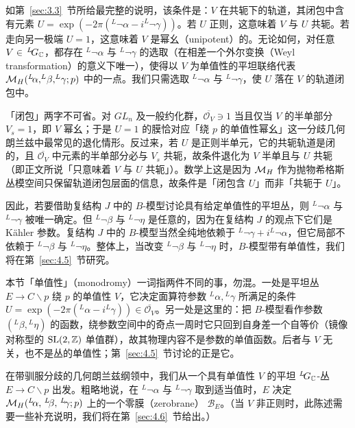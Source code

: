 如第~\ref{sec:3.3}~节所给最完整的说明，该条件是：$V$ 在共轭下的轨道，其闭包中含有元素 $U=\exp(-2\pi(^L\neg\alpha-i^L\neg\gamma))$。若 $U$ 正则，这意味着 $V$ 与 $U$ 共轭。若走向另一极端 $U=1$，这意味着 $V$ 是幂幺（unipotent）的。无论如何，对任意 $V\in\, ^L\negthinspace G_{\mathbb{C}}$，都存在 $^L\neg\alpha$ 与 $^L\neg\gamma$ 的选取（在相差一个外尔变换（Weyl transformation）的意义下唯一），使得以 $V$ 为单值性的平坦联络代表
${{\mathcal{M}}_H}(^L\negthinspace\alpha,^L\negthinspace\beta,^L\negthinspace\gamma;p)$ 中的一点。我们只需选取
$^L\neg\alpha$ 与 $^L\neg\gamma$，使 $U$ 落在 $V$ 的轨道闭包中。

\begin{yizhu}[含糊点拨]
「闭包」两字不可省。对 $GL_n$ 及一般约化群，$\overline{\mathcal O_V}\ni1$ 当且仅当 $V$ 的半单部分 $V_s=1$，即 $V$ 幂幺；于是 $U=1$ 的膜恰对应「绕 $p$ 的单值性幂幺」这一分歧几何朗兰兹中最常见的退化情形。反过来，若 $U$ 是正则半单元，它的共轭轨道是闭的，且 $\overline{\mathcal O_V}$ 中元素的半单部分必与 $V_s$ 共轭，故条件退化为 $V$ 半单且与 $U$ 共轭（即正文所说「只意味着 $V$ 与 $U$ 共轭」）。数学上这是因为 ${{\mathcal{M}}_H}$ 作为抛物希格斯丛模空间只保留轨道闭包层面的信息，故条件是「闭包含 $U$」而非「共轭于 $U$」。
\end{yizhu}

因此，若要借助复结构 $J$ 中的 $B$-模型讨论具有给定单值性的平坦丛，则
$^L\neg\alpha$ 与 $^L\neg\gamma$ 被唯一确定。但
$^L\neg\beta$ 与 $^L\neg\eta$ 是任意的，因为在复结构 $J$ 的观点下它们是 Kähler 参数。复结构 $J$ 中的
$B$-模型当然全纯地依赖于 $^L\neg\gamma+i^L\neg\alpha$，但它局部不依赖于 $^L\neg\beta$ 与 $^L\neg\eta$。整体上，当改变 $^L\neg\beta$ 与 $^L\neg\eta$ 时，$B$-模型带有单值性，我们将在第~\ref{sec:4.5}~节研究。

\begin{yizhu}[易错点]
本节「单值性」（monodromy）一词指两件不同的事，勿混。一处是平坦丛 $E\to C\backslash p$ 绕 $p$ 的单值性 $V$，它决定面算符参数 ${}^L\alpha,{}^L\gamma$ 所满足的条件 $U=\exp(-2\pi({}^L\alpha-i{}^L\gamma))\in\overline{\mathcal O_V}$。另一处是这里的：把 $B$-模型看作参数 $(^L\beta,{}^L\eta)$ 的函数，绕参数空间中的奇点一周时它只回到自身差一个自等价（镜像对称型的 $\mathrm{SL}(2,{\mathbb{Z}})$ 单值群），故其物理内容不是参数的单值函数。后者与 $V$ 无关，也不是丛的单值性；第~\ref{sec:4.5}~节讨论的正是它。
\end{yizhu}

在带驯服分歧的几何朗兰兹纲领中，我们从一个具有单值性 $V$ 的平坦 $^L\negthinspace G_{\mathbb{C}}$-丛
$E\to C\backslash p$ 出发。粗略地说，在
$^L\neg\alpha$ 与 $^L\neg\gamma$ 取到适当值时，$E$ 决定
${{\mathcal{M}}_H}(^L\negthinspace\alpha,\,^L\negthinspace\beta,\,^L\negthinspace\gamma;p)$ 上的一个零膜（zerobrane）
${\mathcal B}_E$。（当 $V$ 非正则时，此陈述需要一些补充说明，我们将在第~\ref{sec:4.6}~节给出。）

